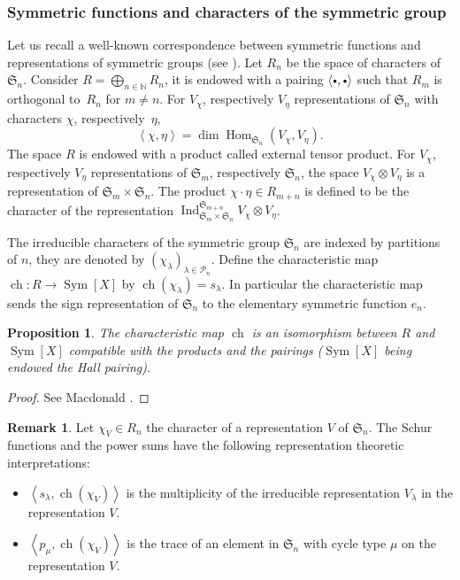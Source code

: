 \documentclass[JEP,XML,SOM,NoEqCountersInSection,Unicode,published]{cedram}
\newcommand{\sbullet}{{\scriptscriptstyle\bullet}}
\newcommand{\csbullet}{{\raisebox{1pt}{$\sbullet$}}}
\theoremstyle{definition}
\newtheorem{remark}[definition]{Remark}
\theoremstyle{plain}
\newtheorem{proposition}[definition]{Proposition}
\DeclareMathOperator{\Hom}{Hom}
\DeclareMathOperator{\SymF}{Sym}
\DeclareMathOperator{\Ind}{Ind}
\DeclareMathOperator{\ch}{ch}
\newcommand{\Sym}{\mathfrak{S}}
\newcommand{\SymX}{\SymF [X]}
\newcommand{\Part}{\mathcal{P}}
\begin{document}
\subsubsection{Symmetric functions and characters of the symmetric group}
Let us recall a well-known correspondence between symmetric functions and representations of symmetric groups (see \cite{Macdonald}). Let $R_n$ be the space of characters of $\Sym_n$. Consider $R=\bigoplus_{n\in\mathbb{N}} R_n$, it is endowed with a pairing $\langle\csbullet,\csbullet\rangle$ such that $R_m$ is orthogonal to~$R_n$ for $m\ne n$. For $V_\chi$, respectively $V_\eta$ representations of $\Sym_n$ with characters $\chi$, respectively~$\eta$,
\[
\left\langle \chi,\eta\right\rangle = \dim \Hom_{\Sym_n}(V_{\chi}, V_{\eta}).
\]
The space $R$ is endowed with a product called external tensor product. For $V_\chi$, respectively $V_{\eta}$ representations of $\Sym_m$, respectively $\Sym_n$, the space $V_\chi \otimes V_\eta$ is a representation of $\Sym_m \times \Sym_n$. The product $\chi\cdot\eta\in R_{m+n}$ is defined to be the character of the representation $\Ind_{\Sym_m\times\Sym_n}^{\Sym_{m+n}}V_\chi \otimes V_\eta$.

The irreducible characters of the symmetric group $\Sym_n$ are indexed by partitions of $n$, they are denoted by $(\chi_{\lambda})_{\lambda\in\Part_n}$. Define the characteristic map $\ch:R\to \SymF[X]$ by $\ch(\chi_{\lambda})=s_{\lambda}$.
In particular the characteristic map sends the sign representation of $\Sym_n$ to the elementary symmetric function $e_n$.

\begin{proposition}\label{prop_characteristic_map}
The characteristic map $\ch$ is an isomorphism between $R$ and $\SymX$ compatible with the products and the pairings ($\SymX$ being endowed the Hall pairing).
\end{proposition}
\begin{proof}
See Macdonald \cite[I-7]{Macdonald}.
\end{proof}

\begin{remark}\label{remark_trace_mult}
Let $\chi_V\in R_n$ the character of a representation $V$ of $\Sym_n$. The Schur functions and the power sums have the following representation theoretic interpretations:
\begin{itemize}
\item $\left\langle s_{\lambda},\ch(\chi_{V})\right\rangle$ is the multiplicity of the irreducible representation $V_{\lambda}$ in the representation $V$.
\item $\left\langle p_{\mu},\ch(\chi_{V})\right\rangle$ is the trace of an element in $\Sym_n$ with cycle type $\mu$ on the representation $V$.
\end{itemize}
\end{remark}
\end{document}
